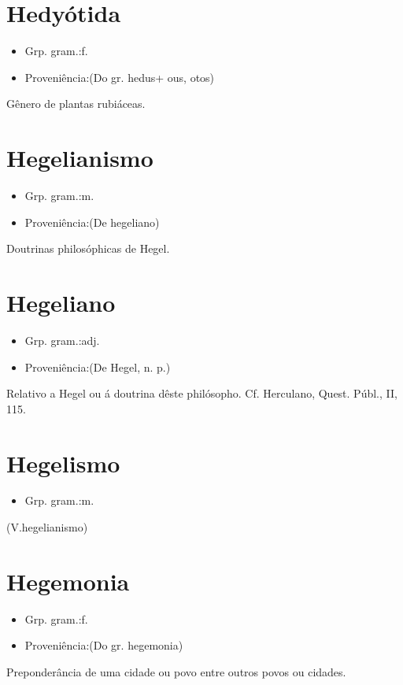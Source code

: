 \documentclass{article}
\begin{document}
\section{Hedyótida}
\begin{itemize}
\item {Grp. gram.:f.}
\end{itemize}
\begin{itemize}
\item {Proveniência:(Do gr. \textunderscore hedus\textunderscore  + \textunderscore ous\textunderscore , \textunderscore otos\textunderscore )}
\end{itemize}
Gênero de plantas rubiáceas.
\section{Hegelianismo}
\begin{itemize}
\item {Grp. gram.:m.}
\end{itemize}
\begin{itemize}
\item {Proveniência:(De \textunderscore hegeliano\textunderscore )}
\end{itemize}
Doutrinas philosóphicas de Hegel.
\section{Hegeliano}
\begin{itemize}
\item {Grp. gram.:adj.}
\end{itemize}
\begin{itemize}
\item {Proveniência:(De \textunderscore Hegel\textunderscore , n. p.)}
\end{itemize}
Relativo a Hegel ou á doutrina dêste philósopho. Cf. Herculano, \textunderscore Quest. Públ.\textunderscore , II, 115.
\section{Hegelismo}
\begin{itemize}
\item {Grp. gram.:m.}
\end{itemize}
(V.hegelianismo)
\section{Hegemonia}
\begin{itemize}
\item {Grp. gram.:f.}
\end{itemize}
\begin{itemize}
\item {Proveniência:(Do gr. \textunderscore hegemonia\textunderscore )}
\end{itemize}
Preponderância de uma cidade ou povo entre outros povos ou cidades.
\end{document}
